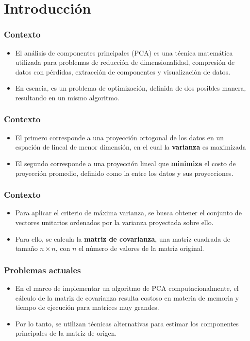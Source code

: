 \section{Introducción}

\begin{frame}
\frametitle{Contexto}
\begin{itemize}
    \item El análisis de componentes principales (PCA) es una técnica matemática utilizada para problemas de reducción de dimensionalidad,
    compresión de datos con pérdidas, extracción de componentes y visualización de datos.
    \item En esencia, es un problema de optimización, definida de dos posibles manera, resultando en un mismo algoritmo.
\end{itemize}
\end{frame}


\begin{frame}
\frametitle{Contexto}
\begin{itemize}
    \item El primero corresponde a una proyección ortogonal de los datos en un espación de lineal de menor dimensión, en el cual la \textbf{varianza} es maximizada
    \item El segundo corresponde a una proyección lineal que \textbf{minimiza} el costo de proyección promedio, definido como la  entre los datos y sus proyecciones.
\end{itemize}
\end{frame}

\begin{frame}
\frametitle{Contexto}
\begin{itemize}
    \item Para aplicar el criterio de máxima varianza, se busca obtener el conjunto de vectores unitarios ordenados por la varianza proyectada sobre ello.
    \item Para ello, se calcula la \textbf{matriz de covarianza}, una matriz cuadrada de tamaño $n \times n$, con $n$ el número de valores de la matriz original.
\end{itemize}
\end{frame}

\begin{frame}
\frametitle{Problemas actuales}
\begin{itemize}
    \item En el marco de implementar un algoritmo de PCA computacionalmente, el cálculo de la matriz de covarianza resulta costoso en materia de memoria y tiempo de ejecución para matrices muy grandes.
    \item Por lo tanto, se utilizan técnicas alternativas para estimar los componentes principales de la matriz de origen.
\end{itemize}
\end{frame}

